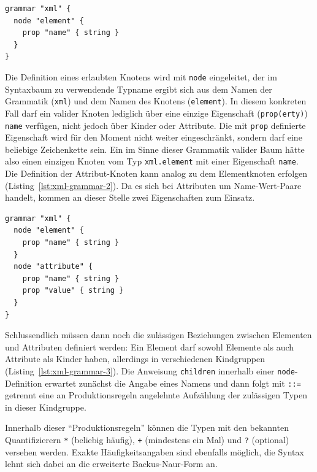 \documentclass[paper=a4,fontsize=11pt,parskip=half]{scrartcl}
\begin{document}
\begin{lstlisting}[float=h, label={lst:xml-grammar-1},caption={\texttt{XML} Schritt 1 - Elemente mit Namen},captionpos=b,language={Grammar}]
grammar "xml" {
  node "element" {
    prop "name" { string }
  }
}
\end{lstlisting}

Die Definition eines erlaubten Knotens wird mit \texttt{node} eingeleitet, der im Syntaxbaum zu verwendende Typname ergibt sich aus dem Namen der Grammatik (\texttt{xml}) und dem Namen des Knotens (\texttt{element}). In diesem konkreten Fall darf ein valider Knoten lediglich über eine einzige Eigenschaft (\texttt{prop(erty)}) \texttt{name} verfügen, nicht jedoch über Kinder oder Attribute. Die mit \texttt{prop} definierte Eigenschaft wird für den Moment nicht weiter eingeschränkt, sondern darf eine beliebige Zeichenkette sein. Ein im Sinne dieser Grammatik valider Baum hätte also einen einzigen Knoten vom Typ \texttt{xml.element} mit einer Eigenschaft \texttt{name}. Die Definition der Attribut-Knoten kann analog zu dem Elementknoten erfolgen (Listing~\ref{lst:xml-grammar-2}). Da es sich bei Attributen um Name-Wert-Paare handelt, kommen an dieser Stelle zwei Eigenschaften zum Einsatz.

\begin{lstlisting}[float=h, label={lst:xml-grammar-2},caption={\texttt{XML} Schritt 2 - Elemente mit Namen, Attribute mit Schlüssel-Wert-Paaren},captionpos=b,language={Grammar}]
grammar "xml" {
  node "element" {
    prop "name" { string }
  }
  node "attribute" {
    prop "name" { string }
    prop "value" { string }
  }
}
\end{lstlisting}

Schlussendlich müssen dann noch die zulässigen Beziehungen zwischen Elementen und Attributen definiert werden: Ein Element darf sowohl Elemente als auch Attribute als Kinder haben, allerdings in verschiedenen Kindgruppen (Listing~\ref{lst:xml-grammar-3}). Die Anweisung \texttt{children} innerhalb einer \texttt{node}-Definition erwartet zunächst die Angabe eines Namens und dann folgt mit \texttt{::=} getrennt eine an Produktionsregeln angelehnte Aufzählung der zulässigen Typen in dieser Kindgruppe.

Innerhalb dieser \enquote{Produktionsregeln} können die Typen mit den bekannten Quantifizierern \texttt{*} (beliebig häufig), \texttt{+} (mindestens ein Mal) und \texttt{?} (optional) versehen werden. Exakte Häufigkeitsangaben sind ebenfalls möglich, die Syntax lehnt sich dabei an die erweiterte Backus-Naur-Form an.
\end{document}
